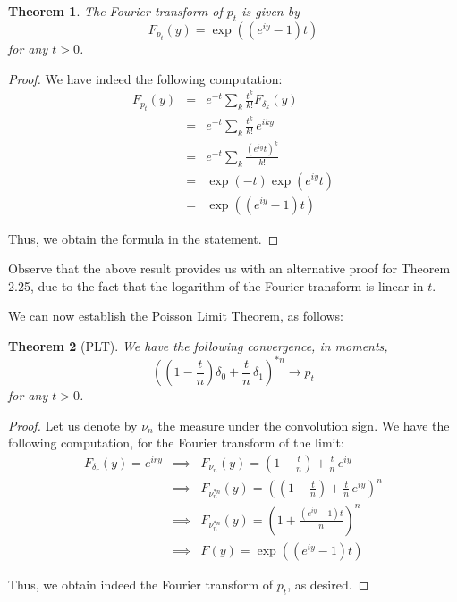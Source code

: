\documentclass[12pt]{amsbook}
\newtheorem{theorem}{Theorem}[chapter]
\begin{document}

\begin{theorem}
The Fourier transform of $p_t$ is given by
$$F_{p_t}(y)=\exp\left((e^{iy}-1)t\right)$$
for any $t>0$.
\end{theorem}

\begin{proof}
We have indeed the following computation:
\begin{eqnarray*}
F_{p_t}(y)
&=&e^{-t}\sum_k\frac{t^k}{k!}F_{\delta_k}(y)\\
&=&e^{-t}\sum_k\frac{t^k}{k!}\,e^{iky}\\
&=&e^{-t}\sum_k\frac{(e^{iy}t)^k}{k!}\\
&=&\exp(-t)\exp(e^{iy}t)\\
&=&\exp\left((e^{iy}-1)t\right)
\end{eqnarray*}

Thus, we obtain the formula in the statement.
\end{proof}

Observe that the above result provides us with an alternative proof for Theorem 2.25, due to the fact that the logarithm of the Fourier transform is linear in $t$.

\bigskip

We can now establish the Poisson Limit Theorem, as follows:


\begin{theorem}[PLT]
We have the following convergence, in moments,
$$\left(\left(1-\frac{t}{n}\right)\delta_0+\frac{t}{n}\,\delta_1\right)^{*n}\to p_t$$
for any $t>0$.
\end{theorem}

\begin{proof}
Let us denote by $\nu_n$ the measure under the convolution sign. We have the following computation, for the Fourier transform of the limit: 
\begin{eqnarray*}
F_{\delta_r}(y)=e^{iry}
&\implies&F_{\nu_n}(y)=\left(1-\frac{t}{n}\right)+\frac{t}{n}\,e^{iy}\\
&\implies&F_{\nu_n^{*n}}(y)=\left(\left(1-\frac{t}{n}\right)+\frac{t}{n}\,e^{iy}\right)^n\\
&\implies&F_{\nu_n^{*n}}(y)=\left(1+\frac{(e^{iy}-1)t}{n}\right)^n\\
&\implies&F(y)=\exp\left((e^{iy}-1)t\right)
\end{eqnarray*}

Thus, we obtain indeed the Fourier transform of $p_t$, as desired.
\end{proof}
\end{document}
